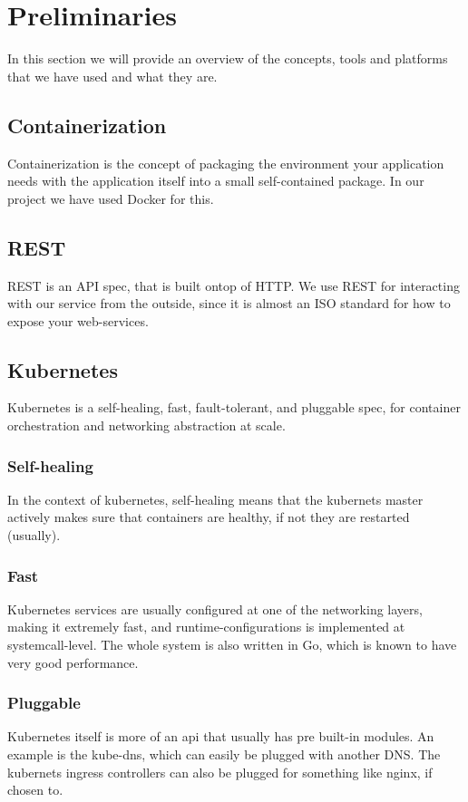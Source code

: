 
\section{Preliminaries}\label{sec:preliminaries}
In this section we will provide an overview of the concepts, tools and platforms that we have used and what they are.
\subsection{Containerization}
Containerization is the concept of packaging the environment your application needs with the application itself into a small self-contained package.
In our project we have used Docker for this.
\subsection{REST}
REST is an API spec, that is built ontop of HTTP. We use REST for interacting with our service from the outside, since it is almost an ISO standard for how to expose your web-services.
\subsection{Kubernetes}
Kubernetes is a self-healing, fast, fault-tolerant, and pluggable spec, for container orchestration and networking abstraction at scale.
\subsubsection{Self-healing}
In the context of kubernetes, self-healing means that the kubernets master actively makes sure that containers are healthy, if not they are restarted (usually).
\subsubsection{Fast}
Kubernetes services are usually configured at one of the networking layers, making it extremely fast, and runtime-configurations is implemented at systemcall-level.
The whole system is also written in Go, which is known to have very good performance.
\subsubsection{Pluggable}
Kubernetes itself is more of an api that usually has pre built-in modules.
An example is the kube-dns, which can easily be plugged with another DNS.
The kubernets ingress controllers can also be plugged for something like nginx, if chosen to.
